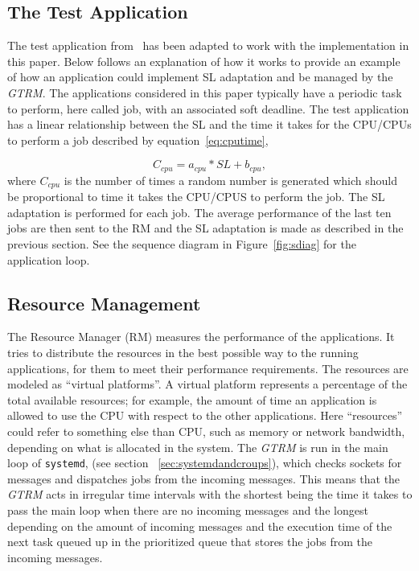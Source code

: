 \documentclass[nobiblatex]{LTHthesis}
\begin{document}
\subsection{The Test Application}
The test application from~\cite{gtrm} has been adapted to work with the implementation in this paper. Below follows an explanation of how it works to provide an example of how an application could implement SL adaptation and be managed by the \emph{GTRM}.
The applications considered in this paper typically have a periodic task to perform, here called job, with an associated soft deadline.
The test application has a linear relationship between the SL and the time it takes for the CPU/CPUs to perform a job described by equation~\ref{eq:cputime},

\begin{equation}
C_{cpu} = a_{cpu}*SL + b_{cpu},
\label{eq:cputime}
\end{equation} 
where $C_{cpu}$ is the number of times a random number is generated which
should be proportional to time it takes the CPU/CPUS to perform the job.
The SL adaptation is  performed for each job. The average performance of the
last ten jobs are then sent to the RM and the SL adaptation is made as
described in the previous section. See the sequence diagram in 
Figure~\ref{fig:sdiag} for the application loop.

\subsection{Resource Management}

The Resource Manager (RM) measures the performance of the applications. It
tries to distribute the resources in the best possible way to the running
applications, for them to meet their performance requirements. The resources
are modeled as ``virtual platforms''. A virtual platform represents a
percentage of the total available resources; for example, the amount of time
an application is allowed to use the CPU with respect to the other 
applications. Here ``resources'' could refer to something else than CPU,
such as memory or network bandwidth, depending on what is allocated in the
system. The \emph{GTRM} is run in the main loop of \texttt{systemd}, (see section ~\ref{sec:systemdandcroups}), which checks sockets for messages and dispatches jobs from the incoming messages. This means that the 
\emph{GTRM} acts in irregular time intervals with the shortest being the time it 
takes to pass the main loop when there are no incoming messages and the 
longest depending on the amount of incoming messages and the execution time of 
the next task queued up in the prioritized queue that stores the jobs from the 
incoming messages. 
\end{document}
